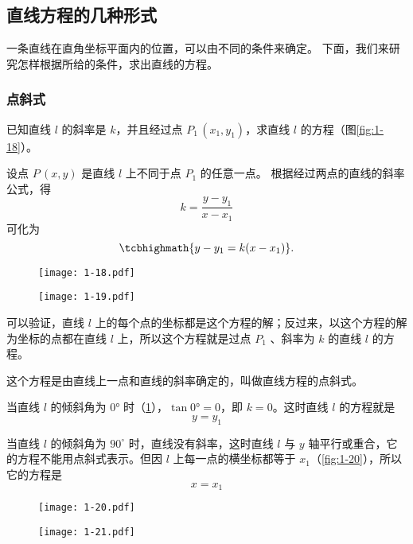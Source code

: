 \subsection{直线方程的几种形式}
一条直线在直角坐标平面内的位置，可以由不同的条件来确定。
下面，我们来研究怎样根据所给的条件，求出直线的方程。

\subsubsection{点斜式}
已知直线 $l$ 的斜率是 $k$，并且经过点 $P_1\,(x_1,y_1)$，求直线 $l$ 的方程（图\cref{fig:1-18}）。

设点 $P\,(x,y)$ 是直线 $l$ 上不同于点 $P_1$ 的任意一点。
根据经过两点的直线的斜率公式，得
\[k = \frac{y - y_1}{x - x_1} \]
可化为
\[\tcbhighmath{y - y_1= k(x - x_1)}.\]

\begin{figure}
  \begin{minipage}[b]{0.48\linewidth}\centering
    \texttt{[image: 1-18.pdf]}
    \caption{}\label{fig:1-18}
  \end{minipage}
  \begin{minipage}[b]{0.48\linewidth}\centering
    \texttt{[image: 1-19.pdf]}
    \caption{}\label{fig:1-19}
  \end{minipage}
\end{figure}

可以验证，直线 $l$ 上的每个点的坐标都是这个方程的解；反过来，以这个方程的解为坐标的点都在直线 $l$ 上，所以这个方程就是过点 \({P}_{1}\) 、斜率为 $k$ 的直线 $l$ 的方程。

这个方程是由直线上一点和直线的斜率确定的，叫做直线方程的点斜式。

当直线 $l$ 的倾斜角为 \ang{0} 时（\cref{fig:1-19}），$\tan\ang{0}=0$，即 $k=0$。这时直线 $l$ 的方程就是
\[ y = y_1 \]

当直线 $l$ 的倾斜角为 \({90}^{ \circ }\) 时，直线没有斜率，这时直线 $l$ 与 \(y\) 轴平行或重合，它的方程不能用点斜式表示。但因 $l$ 上每一点的横坐标都等于 $x_1$（\cref{fig:1-20}），所以它的方程是
\[ x = x_1 \]

\begin{figure}
  \begin{minipage}[b]{0.48\linewidth}\centering
    \texttt{[image: 1-20.pdf]}
    \caption{}\label{fig:1-20}
  \end{minipage}
  \begin{minipage}[b]{0.48\linewidth}\centering
    \texttt{[image: 1-21.pdf]}
    \caption{}\label{fig:1-21}
  \end{minipage}
\end{figure}

